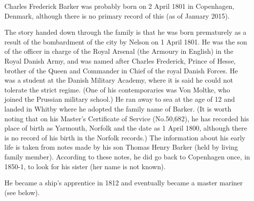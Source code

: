 
Charles Frederick Barker was probably born on 2 April 1801 in Copenhagen, Denmark, although there is no primary record of this (as of January 2015).

The story handed down through the family is that he was born prematurely as a result of the bombardment of the city by Nelson on 1 April 1801. He was the son of the officer in charge of the Royal Arsenal (the Armoury in English) in the Royal Danish Army, and was named after Charles Frederick, Prince of Hesse, brother of the Queen and Commander in Chief of the royal Danish Forces. He was a student at the Danish Military Academy, where it is said he could not tolerate the strict regime. (One of his contemporaries was Von Moltke, who joined the Prussian military school.) He ran away to sea at the age of 12 and landed in Whitby where he adopted the family name of Barker. (It is worth noting that on his Master's Certificate of Service (No.50,682), he has recorded his place of birth as Yarmouth, Norfolk and the date as 1 April 1800, although there is no record of his birth in the Norfolk records.) The information about his early life is taken from notes made by his son Thomas Henry Barker (held by living family member). According to these notes, he did go back to Copenhagen once, in 1850-1, to look for his sister (her name is not known).

He became a ship's apprentice in 1812 \cite{CFBShipList} and eventually became a master mariner (see below).

